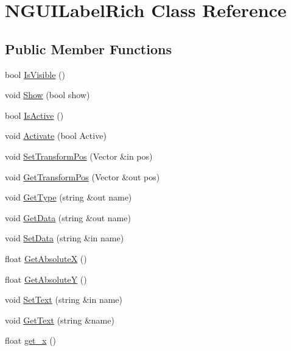 \hypertarget{class_n_g_u_i_label_rich}{}\section{N\+G\+U\+I\+Label\+Rich Class Reference}
\label{class_n_g_u_i_label_rich}
\subsection*{Public Member Functions}
\begin{DoxyCompactItemize}
\item 
bool \hyperlink{class_n_g_u_i_label_rich_aebd37b3a18222b7c9d9d907de2a6f650}{Is\+Visible} ()
\item 
void \hyperlink{class_n_g_u_i_label_rich_a25677f020dfba6f7d8ad21432fa06669}{Show} (bool show)
\item 
bool \hyperlink{class_n_g_u_i_label_rich_abb0cbcabe3143d310fc4465071e995a1}{Is\+Active} ()
\item 
void \hyperlink{class_n_g_u_i_label_rich_a5ef1dafc7951089e52d27542bd5911d9}{Activate} (bool Active)
\item 
void \hyperlink{class_n_g_u_i_label_rich_ad51487221f208651c7d5faa9cc212d8d}{Set\+Transform\+Pos} (Vector \&in pos)
\item 
void \hyperlink{class_n_g_u_i_label_rich_a8653bd218c9f243f0a5320edf7d33ea6}{Get\+Transform\+Pos} (Vector \&out pos)
\item 
void \hyperlink{class_n_g_u_i_label_rich_a569d97dd7f7d51b31e94307814015a9f}{Get\+Type} (string \&out name)
\item 
void \hyperlink{class_n_g_u_i_label_rich_a9874fa72186c5a74c9a5610050ea7037}{Get\+Data} (string \&out name)
\item 
void \hyperlink{class_n_g_u_i_label_rich_af89bfd591e9a6f1f0dedaa21759803a2}{Set\+Data} (string \&in name)
\item 
float \hyperlink{class_n_g_u_i_label_rich_aa8abffb46ca693ecf0b861c563cdea60}{Get\+AbsoluteX} ()
\item 
float \hyperlink{class_n_g_u_i_label_rich_a86a2f8a28c577f6dcf81557fa2f994a7}{Get\+AbsoluteY} ()
\item 
void \hyperlink{class_n_g_u_i_label_rich_a53c28af7720137b21a31746acc436688}{Set\+Text} (string \&in name)
\item 
void \hyperlink{class_n_g_u_i_label_rich_ade8f2471a3cea78b7e9f22985d87ac9b}{Get\+Text} (string \&name)
\item 
float \hyperlink{class_n_g_u_i_label_rich_ab3d887c70166b744284183d2cc1d5e22}{get\+\_\+x} ()

\end{DoxyCompactItemize}
